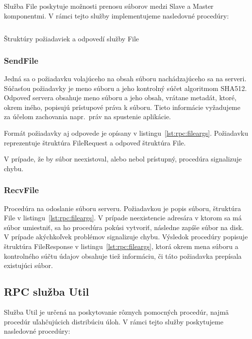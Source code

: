 Služba File poskytuje možnosti prenosu súborov medzi Slave a Master komponentmi.
V rámci tejto služby implementujeme nasledovné procedúry:

\begin{listing}[h]
  \inputminted[frame=lines,framesep=2mm,linenos,fontsize=\scriptsize,firstline=7,lastline=21]{go}{/home/pepol/src/imterra/forge/proto/files.go}
  \caption{Štruktúry požiadaviek a odpovedí služby File}
  \label{lst:rpc:fileargs}
\end{listing}


\subsubsection{SendFile}

Jedná sa o požiadavku volajúceho na obsah súboru nachádzajúceho sa na serveri.
Súčasťou požiadavky je meno súboru a jeho kontrolný súčet algoritmom SHA512.
Odpoveď servera obsahuje meno súboru a jeho obsah, vrátane metadát, ktoré, okrem
iného, popisujú prístupové práva k súboru. Tieto informácie vyžadujeme za účelom
zachovania napr.\ práv na spustenie aplikácie.

Formát požiadavky aj odpovede je opísany v listingu~\ref{lst:rpc:fileargs}.
Požiadavku reprezentuje štruktúra FileRequest a odpoveď štruktúra File.

V prípade, že by súbor neexistoval, alebo nebol prístupný, procedúra signalizuje chybu.

\subsubsection{RecvFile}

Procedúra na odoslanie súboru serveru. Požiadavkou je popis súboru, štruktúra
File v listingu~\ref{lst:rpc:fileargs}. V prípade neexistencie adresára v ktorom
sa má súbor umiestniť, sa ho procedúra pokúsi vytvoriť, následne zapíše súbor
na disk. V prípade akýchkoľvek problémov signalizuje chybu. Výsledok procedúry
popisuje štruktúra FileResponse v listingu~\ref{lst:rpc:fileargs}, ktorá okrem mena
súboru a kontrolného súčtu údajov obsahuje tiež informáciu, či táto požiadavka
prepísala existujúci súbor.

\subsection{RPC služba Util}
\label{sec:slave:rpc:util}

Služba Util je určená na poskytovanie rôznych pomocných procedúr, najmä procedúr
uľahčujúcich distribúciu úloh. V rámci tejto služby poskytujeme nasledovné
procedúry:

